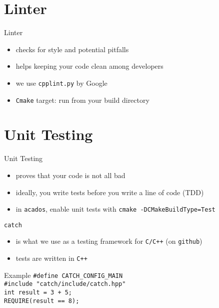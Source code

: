 \documentclass[10pt]{beamer}
\begin{document}
\section{Linter}

\begin{frame}{Linter}
    \begin{itemize}
        \item checks for style and potential pitfalls
        \item helps keeping your code clean among developers
        \item we use \texttt{cpplint.py} by Google
        \item \texttt{Cmake} target: run  from your build directory
    \end{itemize}
\end{frame}

\section{Unit Testing}

\begin{frame}{Unit Testing}
    \begin{itemize}
        \item proves that your code is not all bad
        \item ideally, you write tests before you write a line of code (TDD)
        \item in \texttt{acados}, enable unit tests with \texttt{cmake -DCMakeBuildType=Test}
    \end{itemize}
    \texttt{catch}
    \begin{itemize}
        \item is what we use as a testing framework for \texttt{C/C++} (on \texttt{github})
        \item tests are written in \texttt{C++}
    \end{itemize}
    \begin{beamerboxesrounded}{Example}
        \texttt{\#define CATCH\_CONFIG\_MAIN} \\
        \texttt{\#include "catch/include/catch.hpp"}\\
        \newline
        \texttt{int result = 3 + 5;} \\
        \texttt{REQUIRE(result == 8);}
    \end{beamerboxesrounded}
\end{frame}
\end{document}
